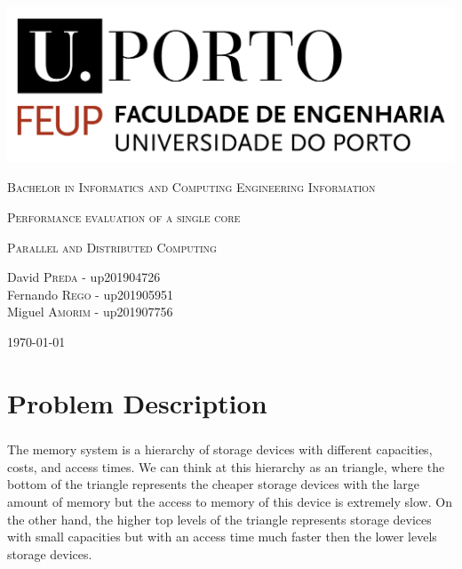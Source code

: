 \documentclass{report}
\begin{document}
	\begin{titlepage}
		\centering
		\includegraphics[scale=0.35]{logo_feup.png}\linebreak
		
		\vspace{1cm}
		
		{\scshape \large Bachelor in Informatics and Computing Engineering
		Information}
		
		\vspace {1cm}
		
		{\scshape\Huge Performance evaluation of a single core \par}
		
		\vfill
		
		{\scshape \large Parallel and Distributed Computing}
		
		\vfill
		
		\Large David \textsc{Preda} - up201904726 \\ Fernando \textsc{Rego} - up201905951 \\ Miguel \textsc{Amorim} - up201907756
		
		\vspace{1cm}
		
		\today
		
	\end{titlepage}

	\tableofcontents
	
	\chapter{Problem Description}
			\paragraph{} The memory system is a hierarchy of storage devices with different capacities, costs, and access times. We can think at this hierarchy as an triangle, where the bottom of the triangle represents the cheaper storage devices with the large amount of memory but the access to memory of this device is extremely slow. On the other hand, the higher top levels of the triangle represents storage devices with small capacities but with an access time much faster then the lower levels storage devices.
			
\end{document}
